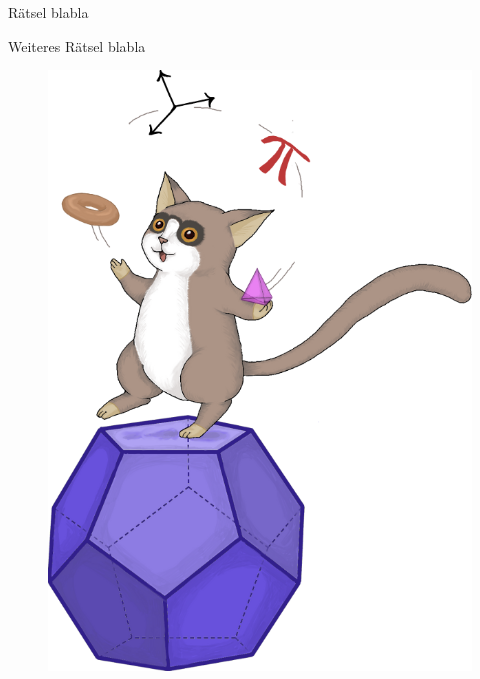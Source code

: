 \documentclass{uebungszettel}
\begin{document}

\begin{aufgabe}{R\"atsel}
blabla
\end{aufgabe}

\begin{aufgabe}{Weiteres R\"atsel}
blabla
\end{aufgabe}

\begin{figure}[H]
\flushright
\includegraphics[scale=0.16]{cover} \hspace*{-20mm}
\end{figure}
\end{document}
